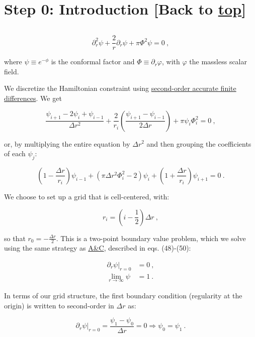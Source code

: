 \documentclass[landscape,letterpaper,10pt,english]{article}
\begin{document}
    \hypertarget{step-0-introduction-back-to-top}{%
\section{\texorpdfstring{Step 0: Introduction {[}Back to
\hyperref[toc]{top}{]}}{Step 0: Introduction {[}Back to {]}}}\label{step-0-introduction-back-to-top}}

\[\label{introduction}\]

\[
\partial^{2}_{r}\psi + \frac{2}{r}\partial_{r}\psi + \pi\Phi^{2}\psi = 0\ ,
\]

where \(\psi \equiv e^{-\phi}\) is the conformal factor and
\(\Phi \equiv \partial_{r}\varphi\), with \(\varphi\) the massless
scalar field.

We discretize the Hamiltonian constraint using
\href{https://en.wikipedia.org/wiki/Finite_difference_coefficient}{second-order
accurate finite differences}. We get

\[
\frac{\psi_{i+1} - 2\psi_{i} + \psi_{i-1}}{\Delta r^{2}} + \frac{2}{r_{i}}\left(\frac{\psi_{i+1}-\psi_{i-1}}{2\Delta r}\right) + \pi\psi_{i}\Phi^{2}_{i} = 0\ ,
\]

or, by multiplying the entire equation by \(\Delta r^{2}\) and then
grouping the coefficients of each \(\psi_{j}\):

\[
\boxed{\left(1-\frac{\Delta r}{r_{i}}\right)\psi_{i-1}+\left(\pi\Delta r^{2}\Phi_{i}^{2}-2\right)\psi_{i} + \left(1+\frac{\Delta r}{r_{i}}\right)\psi_{i+1} = 0}\ .
\]

We choose to set up a grid that is cell-centered, with:

\[
r_{i} = \left(i-\frac{1}{2}\right)\Delta r\ ,
\]

so that \(r_{0} = - \frac{\Delta r}{2}\). This is a two-point boundary
value problem, which we solve using the same strategy as
\href{https://arxiv.org/pdf/1508.01614.pdf}{A\&C}, described in eqs.
(48)-(50):

\begin{align}
\left.\partial_{r}\psi\right|_{r=0} &= 0\ ,\\
\lim_{r\to\infty}\psi &= 1\ .
\end{align}

In terms of our grid structure, the first boundary condition (regularity
at the origin) is written to second-order in \(\Delta r\) as:

\[
\left.\partial_{r}\psi\right|_{r=0} = \frac{\psi_{1} - \psi_{0}}{\Delta r} = 0 \Rightarrow \psi_{0} = \psi_{1}\ .
\]
\end{document}
